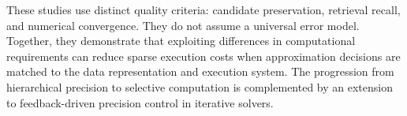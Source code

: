 {These studies use distinct quality criteria: candidate preservation, retrieval recall, and numerical convergence. They do not assume a universal error model. Together, they demonstrate that exploiting differences in computational requirements can reduce sparse execution costs when approximation decisions are matched to the data representation and execution system. The progression from hierarchical precision to selective computation is complemented by an extension to feedback-driven precision control in iterative solvers.
}
